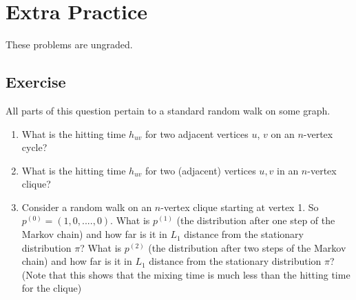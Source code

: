 \documentclass{article}
\newcounter{counter}
\newcommand{\Exercise}{Exercise \stepcounter{counter}\thecounter}
\DeclarePairedDelimiter\abs{\lvert}{\rvert}%
\begin{document}



\pagebreak

\section*{Extra Practice}
These problems are ungraded.

\subsection*{\Exercise}
All parts of this question pertain to a standard random walk on some graph. 
  \begin{enumerate}[label=(\alph*)]
    \item What is the hitting time $h_{uv}$ for two adjacent vertices $u$, $v$ on an $n$-vertex cycle?
    \item What is the hitting time $h_{uv}$ for two (adjacent) vertices $u,v$ in an $n$-vertex clique?
    \item Consider a random walk on an $n$-vertex clique starting at vertex 1. So $p^{(0)} = (1,0,....,0)$. What is $p^{(1)}$ (the distribution after one step of the Markov chain) and how far is it in $L_1$ distance from the stationary distribution $\pi$?     What is $p^{(2)}$ (the distribution after two steps of the Markov chain) and how far is it in $L_1$ distance from the stationary distribution $\pi$?  (Note that this shows that the mixing time is much less than the hitting time for the clique)   
    \end{enumerate}
\end{document}
